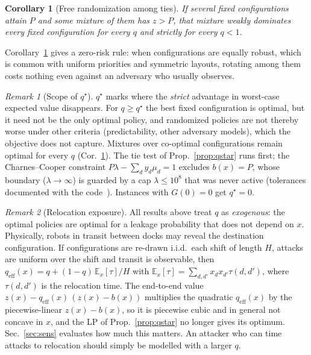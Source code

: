 \documentclass[letterpaper,journal]{IEEEtran}
\newtheorem{corollary}{Corollary}
\theoremstyle{remark}
\newtheorem{remark}{Remark}
\begin{document}
\begin{corollary}[Free randomization among ties]\label{cor:ties}
If several fixed configurations attain $P$ and some mixture of them has $z>P$, that mixture weakly dominates every fixed configuration for every $q$ and strictly for every $q<1$.
\end{corollary}
Corollary~\ref{cor:ties} gives a zero-risk rule: when configurations are equally robust, which is common with uniform priorities and symmetric layouts, rotating among them costs nothing even against an adversary who usually observes.

\begin{remark}[Scope of $q^\star$]\label{rem:scope}
$q^\star$ marks where the \emph{strict} advantage in worst-case expected value disappears. For $q\ge q^\star$ the best fixed configuration is optimal, but it need not be the only optimal policy, and randomized policies are not thereby worse under other criteria (predictability, other adversary models), which the objective does not capture. Mixtures over co-optimal configurations remain optimal for every $q$ (Cor.~\ref{cor:ties}). The tie test of Prop.~\ref{prop:qstar} runs first; the Charnes--Cooper constraint $P\lambda-\sum_dy_d\mu_d=1$ excludes $b(x)=P$, whose boundary ($\lambda\to\infty$) is guarded by a cap $\lambda\le10^8$ that was never active (tolerances documented with the code~\cite{alam2026code}). Instances with $G(0)=0$ get $q^\star=0$.
\end{remark}

\begin{remark}[Relocation exposure]\label{rem:reloc}
All results above treat $q$ as \emph{exogenous}: the optimal policies are optimal for a leakage probability that does not depend on $x$. Physically, robots in transit between docks may reveal the destination configuration. If configurations are re-drawn i.i.d.\ each shift of length $H$, attacks are uniform over the shift and transit is observable, then $q_{\mathrm{eff}}(x)=q+(1-q)\,\mathbb{E}_x[\tau]/H$ with $\mathbb{E}_x[\tau]=\sum_{d,d'}x_dx_{d'}\tau(d,d')$, where $\tau(d,d')$ is the relocation time. The end-to-end value $z(x)-q_{\mathrm{eff}}(x)\,(z(x)-b(x))$ multiplies the quadratic $q_{\mathrm{eff}}(x)$ by the piecewise-linear $z(x)-b(x)$, so it is piecewise cubic and in general not concave in $x$, and the LP of Prop.~\ref{prop:qstar} no longer gives its optimum. Sec.~\ref{sec:sens} evaluates how much this matters. An attacker who can time attacks to relocation should simply be modelled with a larger $q$.
\end{remark}
\end{document}
